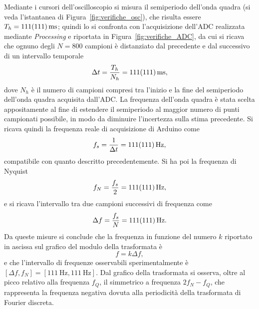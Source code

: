 \documentclass[10pt,oneside,a4paper]{article}
\newenvironment{Figure}
  {\par\medskip\noindent\minipage{\linewidth}}
  {\endminipage\par\medskip}
\begin{document}
\begin{multicols}{2}
Mediante i cursori dell'oscilloscopio si misura il semiperiodo dell'onda quadra (si veda l'istantanea di Figura~\ref{fig:verifiche_osc}), che risulta essere $T_h = \SI{111 \pm 111}{ms}$; quindi lo si confronta con l'acquisizione dell'ADC realizzata mediante \emph{Processing} e riportata in Figura~\ref{fig:verifiche_ADC}, da cui si ricava che ognuno degli $N=800$ campioni è distanziato dal precedente e dal successivo di un intervallo temporale
\[
\Delta t = \frac{T_h}{N_h} = \SI{111 \pm 111}{ms},
\]
dove $N_h$ è il numero di campioni compresi tra l'inizio e la fine del semiperiodo dell'onda quadra acquisita dall'ADC. La frequenza dell'onda quadra è stata scelta appositamente al fine di estendere il semiperiodo al maggior numero di punti campionati possibile, in modo da diminuire l'incertezza sulla stima precedente. Si ricava quindi la frequenza reale di acquisizione di Arduino come
\[
f_s = \frac{1}{\Delta t} = \SI{111 \pm 111}{\Hz},
\]
compatibile con quanto descritto precedentemente. Si ha poi la frequenza di Nyquist
\[
f_N = \frac{f_s}{2} = \SI{111 \pm 111}{\Hz},
\]
e si ricava l'intervallo tra due campioni successivi di frequenza come
\[
\Delta f = \frac{f_s}{N} = \SI{111 \pm 111}{\Hz}.
\]
Da queste misure si conclude che la frequenza in funzione del numero $k$ riportato in ascissa sul grafico del modulo della trasformata è
\begin{equation}\label{eq:ktof}
f = k \Delta f,
\end{equation}
e che l'intervallo di frequenze osservabili sperimentalmente è $[\Delta f, f_N] = [\SI{111}{\Hz}, \SI{111}{\Hz}]$. Dal grafico della trasformata si osserva, oltre al picco relativo alla frequenza $f_Q$, il simmetrico a frequenza $2f_N - f_Q$, che rappresenta la frequenza negativa dovuta alla periodicità della trasformata di Fourier discreta.





\end{multicols}
\end{document}
